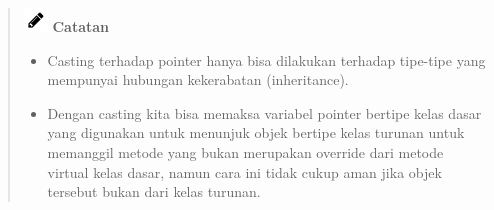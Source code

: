 \begin{quotation}
	\includegraphics{images/pencil} \textbf{Catatan} 
	\begin{itemize}
		\item Casting terhadap pointer hanya bisa dilakukan terhadap tipe-tipe yang
		mempunyai hubungan kekerabatan (inheritance).
		\item  Dengan
		casting kita bisa memaksa variabel pointer bertipe kelas dasar yang
		digunakan untuk menunjuk objek bertipe kelas turunan untuk memanggil
		metode yang bukan merupakan override dari metode virtual kelas dasar,
		namun cara ini tidak cukup aman jika objek tersebut bukan dari kelas
		turunan.
	\end{itemize}
\end{quotation}


